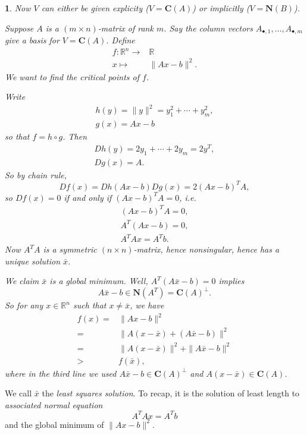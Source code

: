 \documentclass[12pt]{article}
\newtheorem{para}[theorem]{}
\begin{document}
\begin{para} 
	Now $V$ can either be given explicity ($V=\mathbf{C}(A)$) or implicitly ($V=\mathbf{N}(B)$).

	Suppose $A$ is a $(m\times n)$-matrix of rank $m$. Say the column vectors $A_{\bullet, 1},\dots,A_{\bullet, m}$ give a basis for $V=\mathbf{C}(A)$. Define 
	\begin{align*}
		f: \mathbb{R}^n \to& \mathbb{R} \\ 
		x \mapsto& \|Ax-b\|^2.
	\end{align*}
	We want to find the critical points of $f$. 

	Write 
	\begin{gather*}
		h(y) = \|y\|^2 = y_1^2 + \cdots + y_m^2, \\
		g(x) = Ax-b
	\end{gather*}
	so that $f=h\circ g$. Then 
	\begin{gather*}
		Dh(y) = 2y_1 + \cdots + 2y_m = 2y^T, \\
		Dg(x) = A.
	\end{gather*}
	So by chain rule,
	\begin{equation*}
		Df(x) = Dh(Ax-b)Dg(x) = 2(Ax-b)^T A, 
	\end{equation*}
	so $Df(x)=0$ if and only if $(Ax-b)^TA=0$, i.e.
	\begin{gather*}
		(Ax-b)^TA=0, \\ 
		A^T(Ax-b) = 0, \\
		A^TAx=A^Tb.
	\end{gather*}
	Now $A^TA$ is a symmetric $(n\times n)$-matrix, hence nonsingular, hence has a unique solution $\bar{x}$. 

	We claim $\bar{x}$ is a global minimum. Well, $A^T(A\bar{x}-b)=0$ implies 
	\begin{equation*}
		A\bar{x}-b\in\mathbf{N}(A^T)=\mathbf{C}(A)^\perp.
	\end{equation*}
	So for any $x\in\mathbb{R}^n$ such that $x\neq\bar{x}$, we have 
	\begin{align*}
		f(x) 
		=& \|Ax-b\|^2 \\
		=& \|A(x-\bar{x}) + (A\bar{x}-b)\|^2 \\
		=& \|A(x-\bar{x})\|^2 + \|A\bar{x}-b\|^2 \\
		>& f(\bar{x}), 
	\end{align*}
	where in the third line we used $A\bar{x}-b\in\mathbf{C}(A)^\perp$ and $A(x-\bar{x})\in\mathbf{C}(A)$.
\end{para}	

\begin{definition}
	We call $\bar{x}$ the \emph{least squares solution}. To recap, it is the solution of least length to \emph{associated normal equation} 
	\begin{equation*}
		A^TAx = A^Tb \tag{$\ast$}
	\end{equation*}
	and the global minimum of $\|Ax-b\|^2$.
\end{definition}
\end{document}
